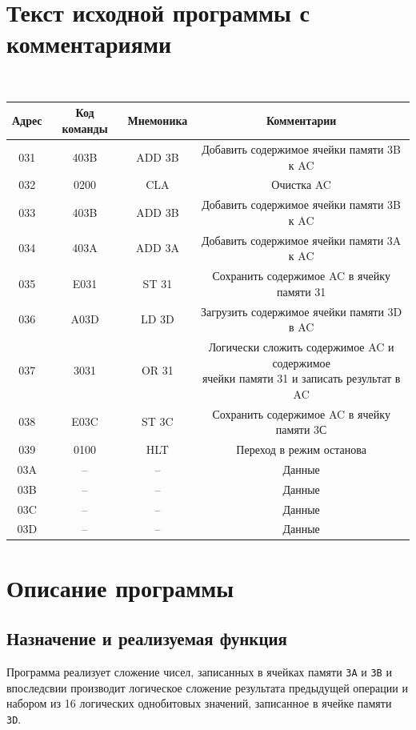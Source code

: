 \documentclass[11pt,a4paper]{article}
\begin{document}
	\section{Текст исходной программы с комментариями}
	\begin{table}[H]
		{\tt
	  \begin{tabular}{|c|c|c|c|}
	  	\hline
	  	\textbf{Адрес} & \textbf{Код команды} & \textbf{Мнемоника} &           \textbf{Комментарии}            \\ \hline
	  	     031       &         403B         &       ADD 3B       & Добавить содержимое ячейки памяти 3B к AC \\ \hline
	  	     032       &         0200         &        CLA         &                Очистка AC                 \\ \hline
	  	     033       &         403B         &       ADD 3B       & Добавить содержимое ячейки памяти 3B к AC \\ \hline
	  	     034       &         403A         &       ADD 3A       & Добавить содержимое ячейки памяти 3A к AC \\ \hline
	  	     035 & E031 & ST 31 & Сохранить содержимое AC в ячейку памяти 31\\ \hline
	  	     036 & A03D & LD 3D & Загрузить содержимое ячейки памяти 3D в AC\\ \hline
	  	     037 & 3031 & OR 31 & \makecell{Логически сложить содержимое AC и содержимое\\ ячейки памяти 31 и записать результат в AC}\\ \hline
	  	     038 & E03C & ST 3C & Сохранить содержимое AC в ячейку памяти 3С\\ \hline
	  	     039 & 0100 & HLT & Переход в режим останова\\ \hline
	  	     03A & -- & -- & Данные\\ \hline
	  	     03B & -- & -- & Данные\\ \hline
	  	     03C & -- & -- & Данные\\ \hline
	  	     03D & -- & -- & Данные\\ \hline
	  \end{tabular}
       }
    \end{table}
\section{Описание программы}
\subsection{Назначение и реализуемая функция}
Программа реализует сложение чисел, записанных в ячейках памяти \texttt{3A} и \texttt{3B} и впоследсвии производит логическое сложение результата предыдущей операции и набором из 16 логических однобитовых значений, записанное в ячейке памяти \texttt{3D}.
\end{document}
